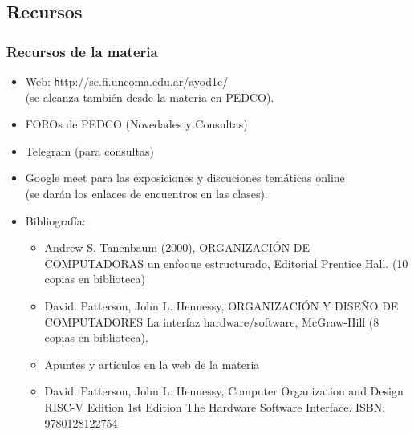 \documentclass[aspectratio=169,compress]{beamer}
\begin{document}









\subsection{Recursos}

\begin{frame}[fragile]
  \frametitle{Recursos de la materia}

\begin{small}
\begin{itemize}

\item Web: \footnotesize{\texttt http://se.fi.uncoma.edu.ar/ayod1c/}\\
(se alcanza también desde la materia en PEDCO).

\item FOROs de PEDCO (Novedades y Consultas)
\item Telegram (para consultas)
\item Google meet para las exposiciones y discuciones temáticas online\\ (se darán los enlaces de encuentros en las clases).
\item Bibliografía:

\begin{itemize}

\item Andrew S. Tanenbaum (2000), ORGANIZACIÓN DE COMPUTADORAS un enfoque estructurado, Editorial Prentice Hall. (10 copias en biblioteca)
\item David. Patterson, John L. Hennessy, ORGANIZACIÓN Y DISEÑO DE COMPUTADORES La interfaz hardware/software, McGraw-Hill (8 copias en biblioteca).
\item Apuntes y artículos en la web de la materia
\item David. Patterson, John L. Hennessy, Computer Organization and Design RISC-V Edition 1st Edition The Hardware Software Interface. ISBN: 9780128122754

\end{itemize}

\end{itemize}
\end{small}

\end{frame}
\end{document}
